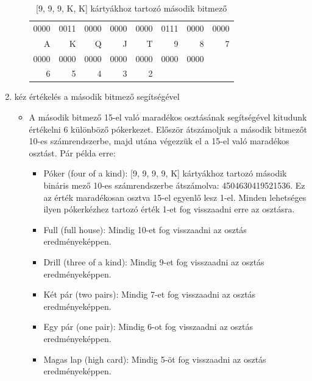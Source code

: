 \documentclass[]{thesis-ekf}
\theoremstyle{definition}
\theoremstyle{remark}
\begin{document}
\begin{enumerate}
\begin{itemize}
		\begin{table}[ht!]
			\centering
			\footnotesize
			\begin{tabular}{*{8}{r}}
				0000 & 0011 & 0000 & 0000 & 0000 & 0111 & 0000 & 0000 \\
				A & K & Q & J & T & 9 & 8 & 7 \\
				0000 & 0000 & 0000 & 0000 & 0000 & 0000 & 0000 \\
				6 & 5 & 4 & 3 & 2 &   &   &   
			\end{tabular}
			\caption{[9, 9, 9, K, K] kártyákhoz tartozó második bitmező}
			\label{tab-bitfieldcounts2}
		\end{table}
		
	\end{itemize}
	\item kéz értékelés a második bitmező segítségével
	\begin{itemize}
		\item A második bitmező 15-el való maradékos osztásának segítségével kitudunk értékelni 6 különböző pókerkezet. Először átszámoljuk a második bitmezőt 10-es számrendszerbe, majd utána végezzük el a 15-el való maradékos osztást. Pár példa erre:
		\begin{itemize}
			\item Póker (four of a kind): [9, 9, 9, 9, K]
			kártyákhoz tartozó második bináris mező 10-es számrendszerbe átszámolva: 4504630419521536. Ez az érték maradékosan osztva 15-el egyenlő lesz 1-el. Minden lehetséges ilyen pókerkézhez tartozó érték 1-et fog visszaadni erre az osztásra.
			\item Full (full  house): Mindig 10-et fog visszaadni az osztás eredményeképpen.
			\item Drill (three of a kind): Mindig 9-et fog visszaadni az osztás eredményeképpen.
			\item Két pár (two pairs): Mindig 7-et fog visszaadni az osztás eredményeképpen.
			\item Egy pár (one pair): Mindig 6-ot fog visszaadni az osztás eredményeképpen.
			\item Magas lap (high card): Mindig 5-öt fog visszaadni az osztás eredményeképpen.
		\end{itemize}
		

\end{itemize}
\end{enumerate}
\end{document}
